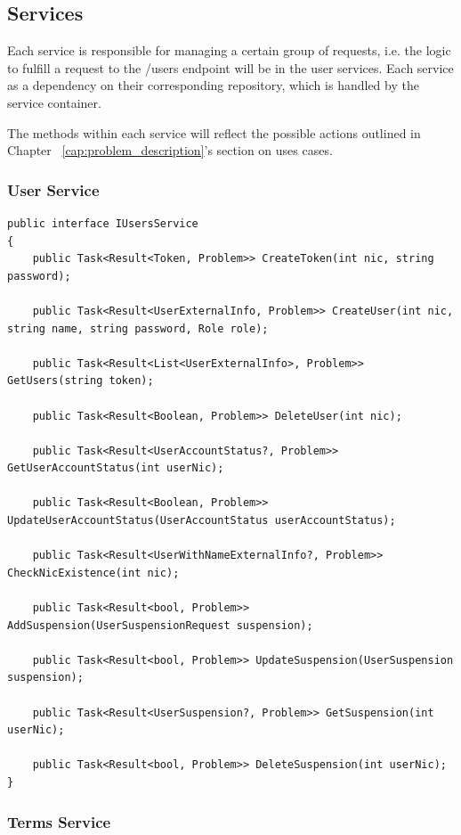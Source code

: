 \newpage

\subsection{Services}
Each service is responsible for managing a certain group of requests, i.e. the logic to fulfill a request to the /users endpoint will be in the user services. Each service as a dependency on their corresponding repository, which is handled by the service container.

The methods within each service will reflect the possible actions outlined in Chapter ~\ref{cap:problem_description}'s section on uses cases.


\subsubsection{User Service}

\begin{lstlisting}[style=sharpc]
public interface IUsersService
{
	public Task<Result<Token, Problem>> CreateToken(int nic, string password);
		
	public Task<Result<UserExternalInfo, Problem>> CreateUser(int nic, string name, string password, Role role);
		
	public Task<Result<List<UserExternalInfo>, Problem>> GetUsers(string token);
		
	public Task<Result<Boolean, Problem>> DeleteUser(int nic);
		
	public Task<Result<UserAccountStatus?, Problem>> GetUserAccountStatus(int userNic);
		
	public Task<Result<Boolean, Problem>> UpdateUserAccountStatus(UserAccountStatus userAccountStatus);
		
	public Task<Result<UserWithNameExternalInfo?, Problem>> CheckNicExistence(int nic);
		
	public Task<Result<bool, Problem>> AddSuspension(UserSuspensionRequest suspension);
		
	public Task<Result<bool, Problem>> UpdateSuspension(UserSuspension suspension);
		
	public Task<Result<UserSuspension?, Problem>> GetSuspension(int userNic);
		
	public Task<Result<bool, Problem>> DeleteSuspension(int userNic);
}
\end{lstlisting}

\newpage

\subsubsection{Terms Service}

